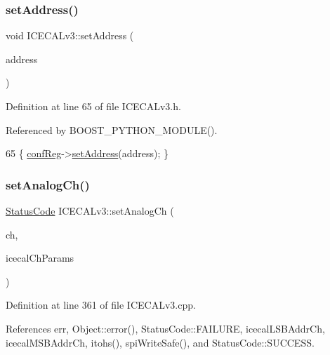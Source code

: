\subsubsection{\texorpdfstring{set\+Address()}{setAddress()}}
{\footnotesize\ttfamily void I\+C\+E\+C\+A\+Lv3\+::set\+Address (\begin{DoxyParamCaption}\item[{\hyperlink{ICECALv3_8h_a3cb25ca6f51f003950f9625ff05536fc}{U8}}]{address }\end{DoxyParamCaption})\hspace{0.3cm}{\ttfamily [inline]}}



Definition at line 65 of file I\+C\+E\+C\+A\+Lv3.\+h.



Referenced by B\+O\+O\+S\+T\+\_\+\+P\+Y\+T\+H\+O\+N\+\_\+\+M\+O\+D\+U\+L\+E().


\begin{DoxyCode}
65 \{   \hyperlink{classICECALv3_a6e8b6c03f5b0f1d8281bf8a0fa46064f}{confReg}->\hyperlink{classIOobject_ae0d372aaeafe3da3c239677118deb2ac}{setAddress}(address);   \}
\end{DoxyCode}
\mbox{\label{classICECALv3_a9578e4d13c250d8bc417f68c79d6a21d}} 
\subsubsection{\texorpdfstring{set\+Analog\+Ch()}{setAnalogCh()}}
{\footnotesize\ttfamily \hyperlink{classStatusCode}{Status\+Code} I\+C\+E\+C\+A\+Lv3\+::set\+Analog\+Ch (\begin{DoxyParamCaption}\item[{int}]{ch,  }\item[{Py\+Object $\ast$}]{icecal\+Ch\+Params }\end{DoxyParamCaption})}



Definition at line 361 of file I\+C\+E\+C\+A\+Lv3.\+cpp.



References err, Object\+::error(), Status\+Code\+::\+F\+A\+I\+L\+U\+RE, icecal\+L\+S\+B\+Addr\+Ch, icecal\+M\+S\+B\+Addr\+Ch, itohs(), spi\+Write\+Safe(), and Status\+Code\+::\+S\+U\+C\+C\+E\+SS.



